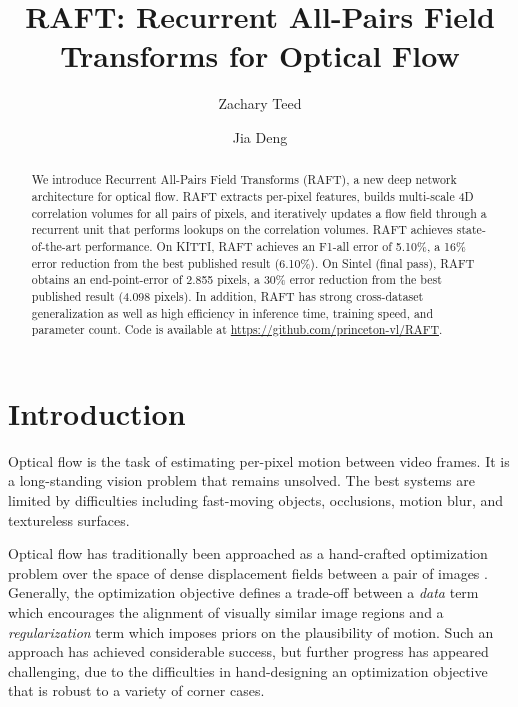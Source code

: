 \documentclass[runningheads]{llncs}
\begin{document}
\pagestyle{headings}
\mainmatter
\def\ECCVSubNumber{3526}  





\title{RAFT: Recurrent All-Pairs Field Transforms for Optical Flow}


\author{Zachary Teed \and Jia Deng}


\maketitle

\begin{abstract}
We introduce Recurrent All-Pairs Field Transforms (RAFT), a new deep network architecture for optical flow. RAFT extracts per-pixel features, builds multi-scale 4D correlation volumes for all pairs of pixels, and iteratively updates a flow field through a recurrent unit that performs lookups on the correlation volumes. RAFT achieves state-of-the-art performance. On KITTI, RAFT achieves an F1-all error of 5.10\%, a 16\% error reduction from the best published result (6.10\%). On Sintel (final pass), RAFT obtains an end-point-error of 2.855 pixels, a 30\% error reduction from the best published result (4.098 pixels). In addition, RAFT has strong cross-dataset generalization as well as high efficiency in inference time, training speed, and parameter count. Code is available at \url{https://github.com/princeton-vl/RAFT}.
\end{abstract}

\section{Introduction}
Optical flow is the task of estimating per-pixel motion between video frames. It is a long-standing vision problem that remains unsolved. The best systems are limited by difficulties including fast-moving objects, occlusions, motion blur, and textureless surfaces. 

Optical flow has traditionally been approached as a hand-crafted optimization problem over the space of dense displacement fields between a pair of images \cite{horn1981determining,tvl1,fullflow}. Generally, the optimization objective defines a trade-off between a \emph{data} term which encourages the alignment of visually similar image regions and a \emph{regularization} term which imposes priors on the plausibility of motion. Such an approach has achieved considerable success, but further progress has appeared challenging, due to the difficulties in hand-designing an optimization objective that is robust to a variety of corner cases. 
\end{document}

